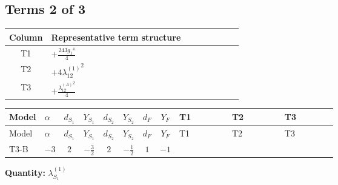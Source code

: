 \documentclass[8pt]{article}
\begin{document}
\begin{landscape}
\subsection*{Terms 2 of 3}
\begin{center}
\begin{tabular}{@{}c >{\raggedright\arraybackslash}p{0.82\linewidth}@{}}
\toprule
Column & Representative term structure \\
\midrule
T1 & \(\displaystyle +\frac{243 {g_1}^4}{4}\) \\
\midrule
T2 & \(\displaystyle +4 {\lambda_{12}^{(1)}}^2\) \\
\midrule
T3 & \(\displaystyle +\frac{{\lambda_{12}^{(A)}}^2}{4}\) \\
\midrule
\bottomrule
\end{tabular}
\end{center}
\smallskip
\tiny
\begin{longtable}{@{}llcccccc >{\raggedright\arraybackslash}p{0.21\linewidth} >{\raggedright\arraybackslash}p{0.21\linewidth} >{\raggedright\arraybackslash}p{0.21\linewidth}@{}}
\toprule
Model & $\alpha$ & $d_{S_1}$ & $Y_{S_1}$ & $d_{S_2}$ & $Y_{S_2}$ & $d_F$ & $Y_F$ & T1 & T2 & T3 \\
\midrule
\endfirsthead
\toprule
Model & $\alpha$ & $d_{S_1}$ & $Y_{S_1}$ & $d_{S_2}$ & $Y_{S_2}$ & $d_F$ & $Y_F$ & T1 & T2 & T3 \\
\midrule
\endhead
T3-B & $-3$ & $2$ & $-\frac{3}{2}$ & $2$ & $-\frac{1}{2}$ & $1$ & $-1$ & \scriptsize\adjustbox{max width=\linewidth}{$\begin{gathered} +\frac{243 {g_1}^4}{4}\end{gathered}$} & \scriptsize\adjustbox{max width=\linewidth}{$\begin{gathered} +4 {\lambda_{12}^{(1)}}^2\end{gathered}$} & \scriptsize\adjustbox{max width=\linewidth}{$\begin{gathered} +\frac{{\lambda_{12}^{(A)}}^2}{4}\end{gathered}$} \\
\midrule
\bottomrule
\end{longtable}
\clearpage
\noindent\textbf{Quantity: }$\lambda_{S_1}^{(1)}$\par\smallskip

\end{landscape}
\end{document}
